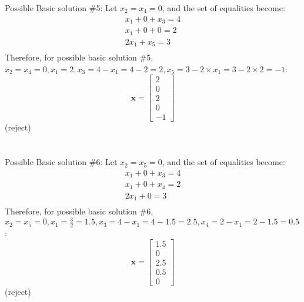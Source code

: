 \documentclass[letter,12pt]{article}
\begin{document}
Possible Basic solution \#5:
Let $x_{2} = x_{4} = 0$, and the set of equalities become:
\begin{eqnarray*}
x_{1} + 0 + x_{3} = 4 \\
x_{1} + 0 + 0 = 2 \\
2x_{1} + x_{5} = 3 \\
\end{eqnarray*}
Therefore, for possible basic solution \#5, $x_{2} = x_{4} = 0, x_{1} = 2, x_{3} = 4 - x_{1} = 4 - 2 = 2, x_{5} = 3 - 2 \times x_{1} = 3 - 2 \times 2 = -1$:
\begin{equation}
\mathbf{x} = \left[
	\begin{array}{c}
	2 \\ 0 \\ 2 \\ 0 \\ -1
	\end{array}
	\right]
\end{equation}
(reject) \\
\ \\
\ \\

Possible Basic solution \#6:
Let $x_{2} = x_{5} = 0$, and the set of equalities become:
\begin{eqnarray*}
x_{1} + 0 + x_{3} = 4 \\
x_{1} + 0 + x_{4} = 2 \\
2x_{1} + 0 = 3 \\
\end{eqnarray*}
Therefore, for possible basic solution \#6, $x_{2} = x_{5} = 0, x_{1} = \frac{3}{2} = 1.5, x_{3} = 4 - x_{1} = 4 - 1.5 = 2.5, x_{4} = 2 - x_{1} = 2 - 1.5 = 0.5$:
\begin{equation}
\mathbf{x} = \left[
	\begin{array}{c}
	1.5 \\ 0 \\ 2.5 \\ 0.5 \\ 0
	\end{array}
	\right]
\end{equation}
(reject) \\
\ \\
\ \\
\end{document}
